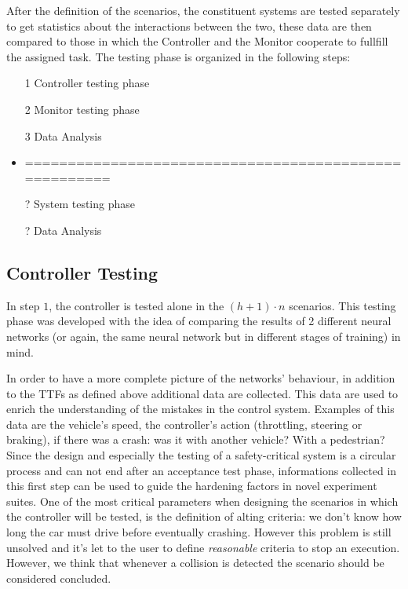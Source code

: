 After the definition of the scenarios, the constituent systems are tested separately to get statistics about the interactions between the two, these data are then compared to those in which the Controller and the Monitor cooperate to fullfill the assigned task.\newline
The testing phase is organized in the following steps:

\begin{itemize}
	\item[1] Controller testing phase
	\item[2] Monitor testing phase
	\item[3] Data Analysis
	\item ======================================================
	\item[?] System testing phase
	\item[?] Data Analysis
\end{itemize}

\subsection{Controller Testing}


In step $1$, the controller is tested alone in the $(h+1)\cdot n$ scenarios. This testing phase was developed with the idea of comparing the results of 2 different neural networks (or again, the same neural network but in different stages of training) in mind.

In order to have a more complete picture of the networks' behaviour, in addition to the TTFs as defined above additional data are collected. This data are used to enrich the understanding of the mistakes in the control system. Examples of this data are the vehicle's speed, the controller's action (throttling, steering or braking), if there was a crash: was it with another vehicle? With a pedestrian? \newline
Since the design and especially the testing of a safety-critical system is a circular process and can not end after an acceptance test phase, informations collected in this first step can be used to guide the hardening factors in novel experiment suites.\newline
One of the most critical parameters when designing the scenarios in which the controller will be tested, is the definition of alting criteria: we don't know how long the car must drive before eventually crashing. However this problem is still unsolved and it's let to the user to define \textsl{reasonable} criteria to stop an execution. However, we think that whenever a collision is detected the scenario should be considered concluded.

